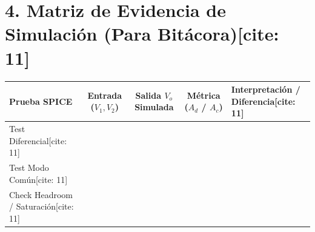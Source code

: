 \documentclass[11pt, a4paper]{article}
\begin{document}
\section*{4. Matriz de Evidencia de Simulación (Para Bitácora)[cite: 11]}
\begin{table}[h!]
    \centering
    \footnotesize
    \renewcommand{\arraystretch}{1.5}
    \begin{tabularx}{\textwidth}{|>{\raggedright\arraybackslash\hsize=0.8\hsize}X|c|c|c|>{\raggedright\arraybackslash\hsize=1.2\hsize}X|}
    \hline
    \rowcolor[HTML]{EFEFEF} 
    \textbf{Prueba SPICE} & \textbf{Entrada ($V_1, V_2$)} & \textbf{Salida $V_o$ Simulada} & \textbf{Métrica ($A_d$ / $A_c$)} & \textbf{Interpretación / Diferencia[cite: 11]} \\ \hline
    Test Diferencial[cite: 11] & & & & \\ \hline
    Test Modo Común[cite: 11] & & & & \\ \hline
    Check Headroom / Saturación[cite: 11] & & & & \\ \hline
    \end{tabularx}
\end{table}
\end{document}
